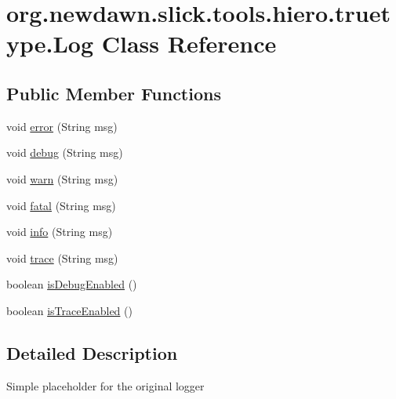 \hypertarget{classorg_1_1newdawn_1_1slick_1_1tools_1_1hiero_1_1truetype_1_1_log}{}\section{org.\+newdawn.\+slick.\+tools.\+hiero.\+truetype.\+Log Class Reference}
\label{classorg_1_1newdawn_1_1slick_1_1tools_1_1hiero_1_1truetype_1_1_log}
\subsection*{Public Member Functions}
\begin{DoxyCompactItemize}
\item 
void \mbox{\hyperlink{classorg_1_1newdawn_1_1slick_1_1tools_1_1hiero_1_1truetype_1_1_log_a96beac00c7fa5c2e86ba2070bff78b56}{error}} (String msg)
\item 
void \mbox{\hyperlink{classorg_1_1newdawn_1_1slick_1_1tools_1_1hiero_1_1truetype_1_1_log_a067b2d2d3d00472e36456a266302dc5b}{debug}} (String msg)
\item 
void \mbox{\hyperlink{classorg_1_1newdawn_1_1slick_1_1tools_1_1hiero_1_1truetype_1_1_log_aa0cb9dec081b4bcfe0d361f8d0ada0f7}{warn}} (String msg)
\item 
void \mbox{\hyperlink{classorg_1_1newdawn_1_1slick_1_1tools_1_1hiero_1_1truetype_1_1_log_a4f18f464bfc9d54f1b6d853b421e8eb5}{fatal}} (String msg)
\item 
void \mbox{\hyperlink{classorg_1_1newdawn_1_1slick_1_1tools_1_1hiero_1_1truetype_1_1_log_a7c258286d01348186fadbb45f0da36b9}{info}} (String msg)
\item 
void \mbox{\hyperlink{classorg_1_1newdawn_1_1slick_1_1tools_1_1hiero_1_1truetype_1_1_log_a0d3284d40d3c3b8a9673fb7dfe12386d}{trace}} (String msg)
\item 
boolean \mbox{\hyperlink{classorg_1_1newdawn_1_1slick_1_1tools_1_1hiero_1_1truetype_1_1_log_ab3229ea9d5f17e4930f755bae1c9c9c7}{is\+Debug\+Enabled}} ()
\item 
boolean \mbox{\hyperlink{classorg_1_1newdawn_1_1slick_1_1tools_1_1hiero_1_1truetype_1_1_log_a73eb47f8fc87ad6130feb4ddbeb492f1}{is\+Trace\+Enabled}} ()
\end{DoxyCompactItemize}


\subsection{Detailed Description}
Simple placeholder for the original logger

